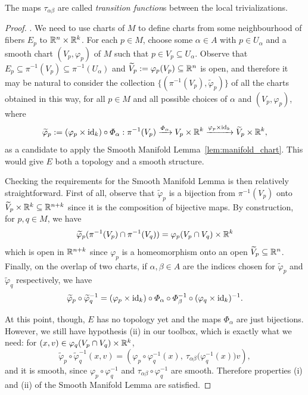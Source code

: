 The maps $\tau_{\alpha\beta}$ are called \emph{transition function}s between the local trivializations.
\begin{proof}
	.
	We need to use charts of $M$ to define charts from some neighbourhood of fibers $E_p$ to $\mathbb{R}^n\times\mathbb{R}^k$.
	For each $p\in M$, choose some $\alpha\in A$ with $p\in U_\alpha$ and a smooth chart $(V_p, \varphi_p)$ of $M$ such that $p\in V_p \subseteq U_\alpha$.
	Observe that $E_p\subseteq\pi^{-1}(V_p) \subseteq \pi^{-1}(U_\alpha)$ and $\widetilde{V}_p := \varphi_p(V_p) \subseteq \mathbb{R}^n$ is open, and therefore it may be natural to consider the collection $\{(\pi^{-1}(V_p), \widetilde{\varphi}_p)\}$ of all the charts obtained in this way, for all $p\in M$ and all possible choices of $\alpha$ and $(V_p,\varphi_p)$, where
	\begin{equation}
		\widetilde{\varphi}_p := (\varphi_p\times \operatorname{id}_k) \circ \varPhi_\alpha : \pi^{-1}(V_p) \xrightarrow{\varPhi_\alpha} V_p\times\mathbb{R}^k \xrightarrow{\varphi_p\times \operatorname{id}_k} \widetilde{V}_p\times \mathbb{R}^k,
	\end{equation}
	as a candidate to apply the Smooth Manifold Lemma~\ref{lem:manifold_chart}.
	This would give $E$ both a topology and a smooth structure.

	Checking the requirements for the Smooth Manifold Lemma is then relatively straightforward.
	First of all, observe that $\widetilde{\varphi}_p$ is a bijection from $\pi^{-1}(V_p)$ onto $\widetilde{V}_p\times\mathbb{R}^k \subseteq \mathbb{R}^{n+k}$ since it is the composition of bijective maps.
	By construction, for $p,q\in M$, we have
	\begin{equation}
		\widetilde{\varphi}_p(\pi^{-1}(V_p) \cap \pi^{-1}(V_q)) = \varphi_p(V_p\cap V_q)\times \mathbb{R}^k
	\end{equation}
	which is open in $\mathbb{R}^{n+k}$ since $\varphi_p$ is a homeomorphism onto an open $\widetilde{V}_p\subseteq\mathbb{R}^n$.
	Finally, on the overlap of two charts, if $\alpha, \beta\in A$ are the indices chosen for $\widetilde{\varphi}_p$ and $\widetilde{\varphi}_q$ respectively, we have
	\begin{equation}
		\widetilde{\varphi}_p \circ \widetilde{\varphi}_q^{-1} =
		(\varphi_p \times \operatorname{id}_k) \circ \varPhi_\alpha \circ \varPhi_\beta^{-1} \circ (\varphi_q \times \operatorname{id}_k)^{-1}.
	\end{equation}

	At this point, though, $E$ has no topology yet and the maps $\varPhi_\alpha$ are just bijections. However, we still have hypothesis (ii) in our toolbox, which is exactly what we need: for $(x,v)\in\varphi_q(V_p\cap V_q)\times\mathbb{R}^k$,
	\begin{equation}
		\widetilde{\varphi}_p \circ \widetilde{\varphi}_q^{-1}(x,v) = \left(\varphi_p\circ\varphi_q^{-1}(x),\ \tau_{\alpha\beta}\big(\varphi_q^{-1}(x)\big)v\right),
	\end{equation}
	and it is smooth, since $\varphi_p\circ\varphi_q^{-1}$ and $\tau_{\alpha\beta}\circ\varphi_q^{-1}$ are smooth.
	Therefore properties (i) and (ii) of the Smooth Manifold Lemma are satisfied.


\end{proof}
